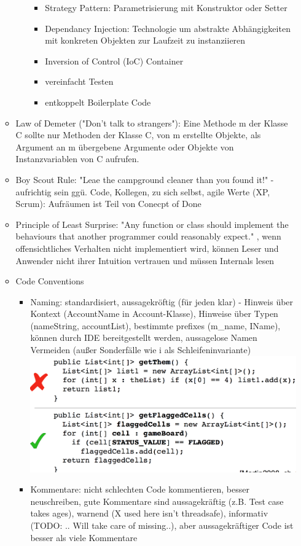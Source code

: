 \documentclass[paper=a4, fontsize=11pt]{scrartcl} %
\numberwithin{equation}{section} %
\numberwithin{figure}{section} %
\numberwithin{table}{section} %
\begin{document}
\begin{itemize}
\begin{itemize}
\begin{itemize}
\begin{itemize}
        \item Strategy Pattern: Parametrisierung mit Konstruktor oder Setter
        \item Dependancy Injection: Technologie um abstrakte Abhängigkeiten mit konkreten Objekten zur Laufzeit zu instanziieren
        \item Inversion of Control (IoC) Container
        \item vereinfacht Testen
        \item entkoppelt Boilerplate Code
      \end{itemize}
    \end{itemize}
    \item Law of Demeter ("Don't talk to strangers"): Eine Methode m der Klasse C sollte nur Methoden der Klasse C, von m erstellte Objekte, als Argument an m übergebene Argumente oder Objekte von Instanzvariablen von C aufrufen.
    \item Boy Scout Rule: "Leae the campground cleaner than you found it!" - aufrichtig sein ggü. Code, Kollegen, zu sich selbst, agile Werte (XP, Scrum): Aufräumen ist Teil von Conecpt of Done
    \item Principle of Least Surprise: "Any function or class should implement the behaviours that another programmer could reasonably expect." , wenn offensichtliches Verhalten nicht implementiert wird, können Leser und Anwender nicht ihrer Intuition vertrauen und müssen Internals lesen
    \item Code Conventions
    \begin{itemize}
      \item Naming: standardisiert, aussagekröftig (für jeden klar) - Hinweis über Kontext (AccountName in Account-Klasse), Hinweise über Typen (nameString, accountList), bestimmte prefixes (m\_name, IName), können durch IDE bereitgestellt werden, aussagelose Namen Vermeiden (außer Sonderfälle wie i als Schleifeninvariante)\\
      \includegraphics[width=.7\linewidth]{imgs/naming}
      \item Kommentare: nicht schlechten Code kommentieren, besser neuschreiben, gute Kommentare sind aussagekräftig (z.B. Test case takes ages), warnend (X used here isn't threadsafe), informativ (TODO: .. Will take care of missing..), aber aussagekräftiger Code ist besser als viele Kommentare\\

\end{itemize}
\end{itemize}
\end{itemize}
\end{document}
